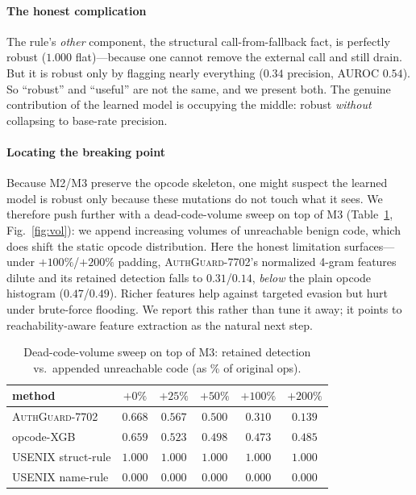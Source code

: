 \documentclass[conference]{IEEEtran}
\newcommand{\tool}{\textsc{AuthGuard-7702}}
\begin{document}
\paragraph{The honest complication} The rule's \emph{other} component, the structural
call-from-fallback fact, is perfectly robust ($1.000$ flat)---because one cannot remove the
external call and still drain. But it is robust only by flagging nearly everything ($0.34$
precision, AUROC $0.54$). So ``robust'' and ``useful'' are not the same, and we present both.
The genuine contribution of the learned model is occupying the middle: robust \emph{without}
collapsing to base-rate precision.

\paragraph{Locating the breaking point} Because M2/M3 preserve the opcode skeleton, one might
suspect the learned model is robust only because these mutations do not touch what it sees. We
therefore push further with a dead-code-volume sweep on top of M3 (Table~\ref{tab:volume},
Fig.~\ref{fig:vol}): we append increasing volumes of unreachable benign code, which does shift
the static opcode distribution. Here the honest limitation surfaces---under $+100\%$/$+200\%$
padding, \tool{}'s normalized 4-gram features dilute and its retained detection falls to
$0.31$/$0.14$, \emph{below} the plain opcode histogram ($0.47$/$0.49$). Richer features help
against targeted evasion but hurt under brute-force flooding. We report this rather than tune it
away; it points to reachability-aware feature extraction as the natural next step.

\begin{table}[t]
\centering
\caption{Dead-code-volume sweep on top of M3: retained detection vs.\ appended unreachable code
(as \% of original ops).}
\label{tab:volume}
\begin{tabular}{lccccc}
\toprule
method & $+0\%$ & $+25\%$ & $+50\%$ & $+100\%$ & $+200\%$ \\
\midrule
\tool{}            & $0.668$ & $0.567$ & $0.500$ & $0.310$ & $0.139$ \\
opcode-XGB         & $0.659$ & $0.523$ & $0.498$ & $0.473$ & $0.485$ \\
USENIX struct-rule & $1.000$ & $1.000$ & $1.000$ & $1.000$ & $1.000$ \\
USENIX name-rule   & $0.000$ & $0.000$ & $0.000$ & $0.000$ & $0.000$ \\
\bottomrule
\end{tabular}
\end{table}
\end{document}
